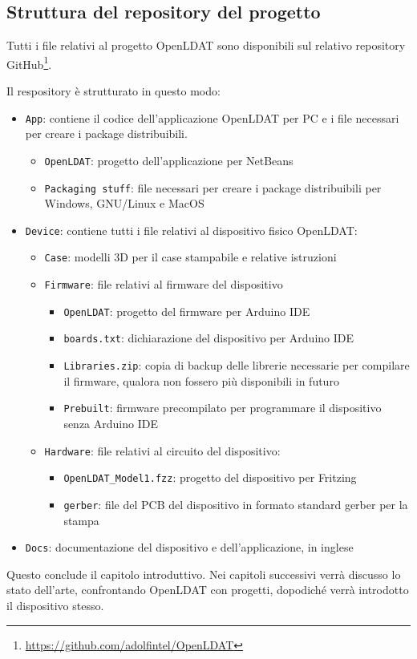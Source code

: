 \subsection{Struttura del repository del progetto}
Tutti i file relativi al progetto OpenLDAT sono disponibili sul relativo repository GitHub\footnote{\url{https://github.com/adolfintel/OpenLDAT}}. %

Il respository è strutturato in questo modo:\begin{itemize}
	\item \texttt{App}: contiene il codice dell'applicazione OpenLDAT per PC e i file necessari per creare i package distribuibili. \begin{itemize}
		\item \texttt{OpenLDAT}: progetto dell'applicazione per NetBeans
		\item \texttt{Packaging stuff}: file necessari per creare i package distribuibili per Windows, GNU/Linux e MacOS
	\end{itemize}
	\item \texttt{Device}: contiene tutti i file relativi al dispositivo fisico OpenLDAT: \begin{itemize}
		\item \texttt{Case}: modelli 3D per il case stampabile e relative istruzioni
		\item \texttt{Firmware}: file relativi al firmware del dispositivo \begin{itemize}
			\item \texttt{OpenLDAT}: progetto del firmware per Arduino IDE
			\item \texttt{boards.txt}: dichiarazione del dispositivo per Arduino IDE
			\item \texttt{Libraries.zip}: copia di backup delle librerie necessarie per compilare il firmware, qualora non fossero più disponibili in futuro
			\item \texttt{Prebuilt}: firmware precompilato per programmare il dispositivo senza Arduino IDE
		\end{itemize}
		\item \texttt{Hardware}: file relativi al circuito del dispositivo: \begin{itemize}
			\item \texttt{OpenLDAT\_Model1.fzz}: progetto del dispositivo per Fritzing
			\item \texttt{gerber}: file del PCB del dispositivo in formato standard gerber per la stampa
		\end{itemize}
	\end{itemize}
	\item \texttt{Docs}: documentazione del dispositivo e dell'applicazione, in inglese
\end{itemize}

Questo conclude il capitolo introduttivo. Nei capitoli successivi verrà discusso lo stato dell'arte, confrontando OpenLDAT con progetti, dopodiché verrà introdotto il dispositivo stesso.

